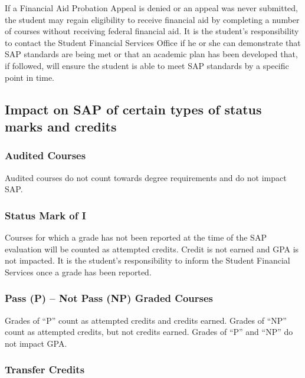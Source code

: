 \documentclass[
  letterpaper,
]{scrbook}
\begin{document}
If a Financial Aid Probation Appeal is denied or an appeal was never
submitted, the student may regain eligibility to receive financial aid
by completing a number of courses without receiving federal financial
aid. It is the student's responsibility to contact the Student Financial
Services Office if he or she can demonstrate that SAP standards are
being met or that an academic plan has been developed that, if followed,
will ensure the student is able to meet SAP standards by a specific
point in time.

\subsection{Impact on SAP of certain types of status marks and
credits}\label{impact-on-sap-of-certain-types-of-status-marks-and-credits}

\subsubsection{\texorpdfstring{\textbf{Audited
Courses}}{Audited Courses}}\label{audited-courses-1}

Audited courses do not count towards degree requirements and do not
impact SAP.

\subsubsection{\texorpdfstring{\textbf{Status Mark of
I}}{Status Mark of I}}\label{status-mark-of-i}

Courses for which a grade has not been reported at the time of the SAP
evaluation will be counted as attempted credits. Credit is not earned
and GPA is not impacted. It is the student's responsibility to inform
the Student Financial Services once a grade has been reported.

\subsubsection{\texorpdfstring{\textbf{Pass (P) -- Not Pass (NP) Graded
Courses}}{Pass (P) -- Not Pass (NP) Graded Courses}}\label{pass-p-not-pass-np-graded-courses}

Grades of ``P'' count as attempted credits and credits earned. Grades of
``NP'' count as attempted credits, but not credits earned. Grades of
``P'' and ``NP'' do not impact GPA.

\subsubsection{\texorpdfstring{\textbf{Transfer
Credits}}{Transfer Credits}}\label{transfer-credits}
\end{document}
